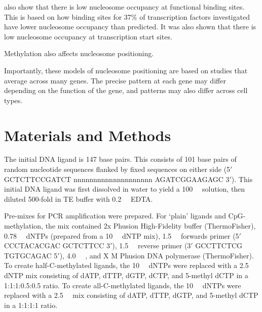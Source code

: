 \documentclass[parskip=full, numbers=noenddot]{scrreprt}
\begin{document}
\cite{segal_genomic_2006} also show that there is low nucleosome occupancy at functional binding sites.  This is based on how binding sites for 37\% of transcription factors investigated have lower nucleosome occupancy than predicted.  It was also shown that there is low nucleosome occupancy at transcription start sites.


Methylation also affects nucleosome positioning.


Importantly, these models of nucleosome positioning are based on studies that average across many genes.  The precise pattern at each gene may differ depending on the function of the gene, and patterns may also differ across cell types.



\subsection{}
\label{ssec:emsaselex_intro_why}


\section{Materials and Methods}
\label{sec:emsaselex_methods}

The initial DNA ligand is 147 base pairs. This consists of 101 base pairs of random nucleotide sequences flanked by fixed sequences on either side (5$'$ GCTCTTCCGATCT nnnnnnnnnnnnnnnnnnnn AGATCGGAAGAGC 3$'$). This initial DNA ligand was first dissolved in water to yield a \SI{100}{\micro\Molar} solution, then diluted 500-fold in TE buffer with \SI{0.2}{\milli\Molar} EDTA.

Pre-mixes for PCR amplification were prepared. For `plain' ligands and CpG-methylation, the mix contained 2x Phusion High-Fidelity buffer (ThermoFisher), \SI{0.78}{\milli\Molar} dNTPs (prepared from a \SI{10}{\milli\Molar} dNTP mix), \SI{1.5}{\micro\Molar} forwards primer (5$'$ CCCTACACGAC GCTCTTCC 3$'$), \SI{1.5}{\micro\Molar} reverse primer (3$'$ GCCTTCTCG TGTGCAGAC 5$'$), \SI{4.0}{\micro\Molar} , and X M Phusion DNA polymerase (ThermoFisher). To create half-C-methylated ligands, the \SI{10}{\milli\Molar} dNTPs were replaced with a \SI{2.5}{\milli\Molar} dNTP mix consisting of dATP, dTTP, dGTP, dCTP, and 5-methyl dCTP in a 1:1:1:0.5:0.5 ratio. To create all-C-methylated ligands, the \SI{10}{\milli\Molar} dNTPs were replaced with a \SI{2.5}{\milli\Molar} mix consisting of dATP, dTTP, dGTP, and 5-methyl dCTP in a 1:1:1:1 ratio.
\end{document}
